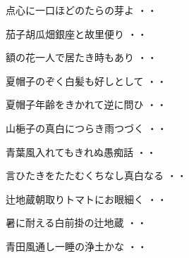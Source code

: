 \vspace{0.6cm}
\begin{shiika}点心に一口ほどのたらの芽よ
\hfill{・・}\end{shiika}
\vspace{0.6cm}
\begin{shiika}茄子胡瓜畑銀座と故里便り
\hfill{・・}\end{shiika}
\vspace{0.6cm}
\begin{shiika}額の花一人で居たき時もあり
\hfill{・・}\end{shiika}
\vspace{0.6cm}
\begin{shiika}夏帽子のぞく白髪も好しとして
\hfill{・・}\end{shiika}
\vspace{0.6cm}
\begin{shiika}夏帽子年齢をきかれて逆に問ひ
\hfill{・・}\end{shiika}
\vspace{0.6cm}
\begin{shiika}山梔子の真白につらき雨つづく
\hfill{・・}\end{shiika}
\vspace{0.6cm}
\begin{shiika}青葉風入れてもきれぬ愚痴話
\hfill{・・}\end{shiika}
\vspace{0.6cm}
\begin{shiika}言ひたきをたたむくちなし真白なる
\hfill{・・}\end{shiika}
\vspace{0.6cm}
\begin{shiika}辻地蔵朝取りトマトにお眼細く
\hfill{・・}\end{shiika}
\vspace{0.6cm}
\begin{shiika}暑に耐える白前掛の辻地蔵
\hfill{・・}\end{shiika}
\vspace{0.6cm}
\begin{shiika}青田風通し一睡の浄土かな
\hfill{・・}\end{shiika}
